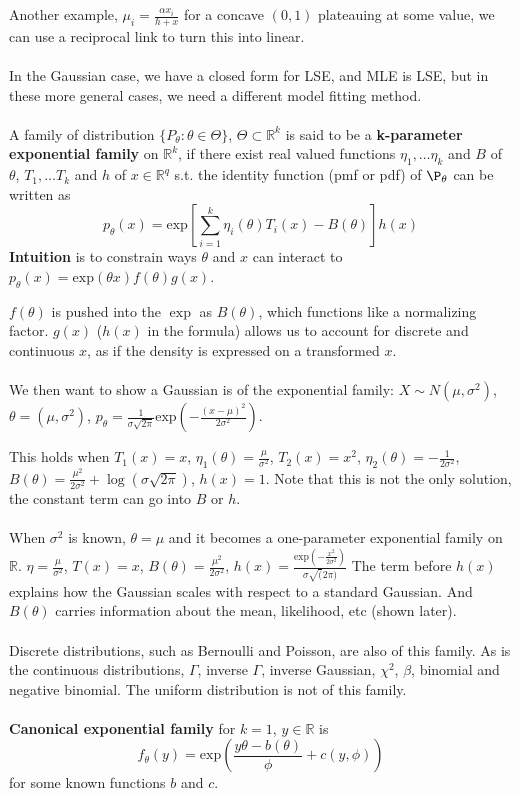 \documentclass{article}
\begin{document}
Another example, $\mu_i = \frac{\alpha x_i}{h + x}$ for a concave $(0, 1)$ plateauing at some value,
we can use a reciprocal link to turn this into linear.
\\
\\
In the Gaussian case, we have a closed form for LSE, and MLE is LSE,
but in these more general cases, we need a different model fitting method.
\\
\\
A family of distribution $\{P_{\theta} : \theta \in \Theta\}$, $\Theta \subset \mathbb{R}^k$ is said to be a
\textbf{k-parameter exponential family} on $\mathbb{R}^k$, if there exist real valued functions
$\eta_1, \dots \eta_k$ and $B$ of $\theta$, $T_1, \dots T_k$ and $h$ of $x \in \mathbb{R}^q$ s.t.
the identity function (pmf or pdf) of $\P_{\theta}$ can be written as
$$
p_{\theta}(x) = \text{exp}[\sum_{i = 1}^{k} \eta_i(\theta) T_i(x) - B(\theta)] h(x)
$$
\textbf{Intuition} is to constrain ways $\theta$ and $x$ can interact to
$p_{\theta}(x) = \text{exp}(\theta x) f(\theta) g(x)$.

$f(\theta)$ is pushed into the $\exp$ as $B(\theta)$,
which functions like a normalizing factor.
$g(x)$ ($h(x)$ in the formula) allows us to account for discrete and continuous $x$,
as if the density is expressed on a transformed $x$.
\\
\\
We then want to show a Gaussian is of the exponential family:
$X \sim \mathit{N}(\mu, \sigma^2)$, $\theta = (\mu, \sigma^2)$,
$p_{\theta} = \frac{1}{\sigma \sqrt{2 \pi}} \text{exp}(-\frac{(x - \mu)^2}{2 \sigma^2})$.

This holds when
$T_1(x) = x$, $\eta_1(\theta) = \frac{\mu}{\sigma^2}$,
$T_2(x) = x^2$, $\eta_2(\theta) = - \frac{1}{2 \sigma^2}$,
$B(\theta) = \frac{\mu^2}{2 \sigma^2} + \log(\sigma \sqrt{2 \pi})$,
$h(x) = 1$.
Note that this is not the only solution,
the constant term can go into $B$ or $h$.
\\
\\
When $\sigma^2$ is known, $\theta = \mu$ and it becomes a one-parameter exponential family on $\mathbb{R}$.
$\eta = \frac{\mu}{\sigma^2}$, $T(x) = x$,
$B(\theta) = \frac{\mu^2}{2 \sigma^2}$, $h(x) = \frac{\text{exp}(-\frac{x^2}{2 \sigma^2})}{\sigma \sqrt(2 \pi)}$
The term before $h(x)$ explains how the Gaussian scales with respect to a standard Gaussian.
And $B(\theta)$ carries information about the mean, likelihood, etc (shown later).
\\
\\
Discrete distributions, such as Bernoulli and Poisson, are also of this family.
As is the continuous distributions, $\Gamma$, inverse $\Gamma$, inverse Gaussian, $\chi^2$, $\beta$, binomial and negative binomial.
The uniform distribution is not of this family.
\\
\\
\textbf{Canonical exponential family} for $k = 1$, $y \in \mathbb{R}$ is
$$
f_{\theta}(y) = \text{exp}(\frac{y \theta - b(\theta)}{\phi} + c(y, \phi))
$$
for some known functions $b$ and $c$.
\end{document}
